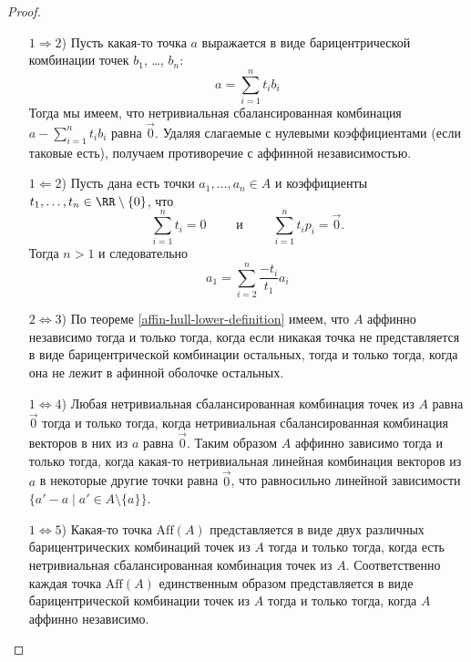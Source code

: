 \documentclass[12pt,a4paper]{article}
\newcommand{\Aff}{\ensuremath{\mathrm{Aff}}\xspace}
\begin{document}
    \begin{proof}
        \begin{itemize}
            \item[$1 \Rightarrow 2$)] Пусть какая-то точка $a$ выражается в виде барицентрической комбинации точек $b_1$, \dots, $b_n$:
                \[a = \sum_{i=1}^n t_i b_i\]
                Тогда мы имеем, что нетривиальная сбалансированная комбинация $a - \sum_{i=1}^n t_i b_i$ равна $\overrightarrow{0}$. Удаляя слагаемые с нулевыми коэффициентами (если таковые есть), получаем противоречие с аффинной независимостью.

            \item[$1 \Leftarrow 2$)] Пусть дана есть точки $a_1, \dots, a_n \in A$ и коэффициенты $t_1, \dots, t_n \in \RR \setminus \{0\}$, что
                \[\sum_{i=1}^n t_i = 0\qquad \text{ и }\qquad \sum_{i=1}^n t_i p_i = \overrightarrow{0}.\]
                Тогда $n > 1$ и следовательно
                \[a_1 = \sum_{i=2}^n \frac{-t_i}{t_1} a_i\]

            \item[$2 \Leftrightarrow 3$)] По теореме \ref{affin-hull-lower-definition} имеем, что $A$ аффинно независимо тогда и только тогда, когда если никакая точка не представляется в виде барицентрической комбинации остальных, тогда и только тогда, когда она не лежит в афинной оболочке остальных.

            \item[$1 \Leftrightarrow 4$)] Любая нетривиальная сбалансированная комбинация точек из $A$ равна $\overrightarrow{0}$ тогда и только тогда, когда нетривиальная сбалансированная комбинация векторов в них из $a$ равна $\overrightarrow{0}$. Таким образом $A$ аффинно зависимо тогда и только тогда, когда какая-то нетривиальная линейная комбинация векторов из $a$ в некоторые другие точки равна $\overrightarrow{0}$, что равносильно линейной зависимости $\{a' - a \mid a' \in A \setminus \{a\}\}$.

            \item[$1 \Leftrightarrow 5$)] Какая-то точка $\Aff(A)$ представляется в виде двух различных барицентрических комбинаций точек из $A$ тогда и только тогда, когда есть нетривиальная сбалансированная комбинация точек из $A$. Соответственно каждая точка $\Aff(A)$ единственным образом представляется в виде барицентрической комбинации точек из $A$ тогда и только тогда, когда $A$ аффинно независимо.
        \end{itemize}
    \end{proof}
\end{document}
